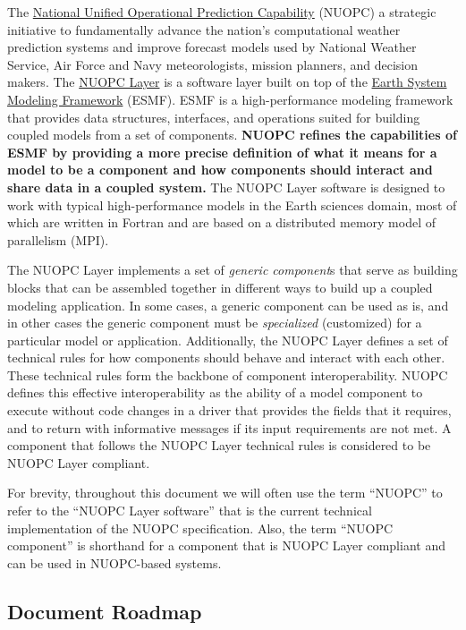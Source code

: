 
The \href{http://www.nws.noaa.gov/nuopc/}{National Unified Operational Prediction Capability}
(NUOPC) a strategic initiative to fundamentally advance the nation's computational
weather prediction systems and improve forecast models used by National Weather Service,
Air Force and Navy meteorologists, mission planners, and decision makers.  The
\href{https://www.earthsystemcog.org/projects/nuopc/}{NUOPC Layer} is
a software layer built on top of the
\href{https://www.earthsystemcog.org/projects/esmf/}{Earth System Modeling Framework} (ESMF).
ESMF is a high-performance modeling framework that provides
data structures, interfaces, and operations suited for building coupled models
from a set of components.  \textbf{NUOPC refines the capabilities of
ESMF by providing a more precise definition of what it means for a model
to be a component and how components should interact and share data
in a coupled system.}  The NUOPC Layer software is designed to work
with typical high-performance models in the Earth sciences domain, most
of which are written in Fortran and are based on a distributed memory
model of parallelism (MPI).

The NUOPC Layer implements a set of \emph{generic component}s that
serve as building blocks that can be assembled together in different ways
to build up a coupled modeling application.  In some cases, a generic
component can be used as is, and in other cases the generic component
must be \emph{specialized} (customized) for a particular model or application.
Additionally, the NUOPC Layer defines a set of technical rules for how components
should behave and interact with each other.  These technical rules form the
backbone of component interoperability.  NUOPC defines this effective interoperability
as the ability of a model component to execute without code changes in a driver that
provides the fields that it requires, and to return with informative messages if its
input requirements are not met. A component that follows the NUOPC Layer technical
rules is considered to be NUOPC Layer compliant.

For brevity, throughout this document we will often use the
term ``NUOPC'' to refer to the ``NUOPC Layer software'' that is
the current technical implementation of the NUOPC specification.
Also, the term ``NUOPC component'' is shorthand for a component
that is NUOPC Layer compliant and can be used in NUOPC-based
systems.

\subsection{Document Roadmap}

